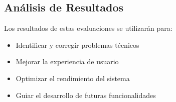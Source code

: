 \subsection{Análisis de Resultados}

Los resultados de estas evaluaciones se utilizarán para:

\begin{itemize}
    \item Identificar y corregir problemas técnicos
    \item Mejorar la experiencia de usuario
    \item Optimizar el rendimiento del sistema
    \item Guiar el desarrollo de futuras funcionalidades
\end{itemize}